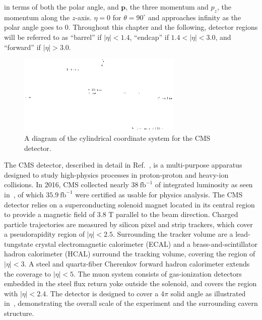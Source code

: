 in terms of both the polar angle, and $\textbf{p}$, the three momentum and $p_{z}$, the momentum along the $z$-axis. $\eta=0$ for $\theta=90^\circ$ and approaches infinity as the polar angle goes to 0. Throughout this chapter and the following, detector regions will be referred to as ``barrel'' if $|\eta|<1.4$, ``endcap'' if $1.4<|\eta|<3.0$, and ``forward'' if $|\eta|>3.0$.

\begin{figure}
  \centering
  \includegraphics[width=0.7\textwidth]{figs/Figures_T_Coordinate.png}
  \caption{A diagram of the cylindrical coordinate system for the CMS detector.}
  \label{fig:coordinates}
\end{figure}

The CMS detector, described in detail in Ref.~\cite{CMS}, is a multi-purpose apparatus designed to study high-\pt physics processes in proton-proton and heavy-ion collisions. In 2016, CMS collected nearly $38\:\textrm{fb}^{-1}$ of integrated luminosity as seen in~, of which $35.9\:\textrm{fb}^{-1}$ were certified as usable for physics analysis. The CMS detector relies on a superconducting solenoid magnet located in its central region to provide a magnetic field of 3.8 T parallel to the beam direction. Charged particle trajectories are measured by silicon pixel and strip trackers, which cover a pseudorapidity region of $|\eta| < 2.5$. Surrounding the tracker volume are a lead-tungstate crystal electromagnetic calorimeter (ECAL) and a brass-and-scintillator hadron calorimeter (HCAL) surround the tracking volume, covering the region of $|\eta| < 3$. A steel and quartz-fiber Cherenkov forward hadron calorimeter extends the coverage to $|\eta| < 5$. The muon system consists of gas-ionization detectors embedded in the steel flux return yoke outside the solenoid, and covers the region with $|\eta| < 2.4$. The detector is designed to cover a 4$\pi$ solid angle as illustrated in~, demonstrating the overall scale of the experiment and the surrounding cavern structure.

